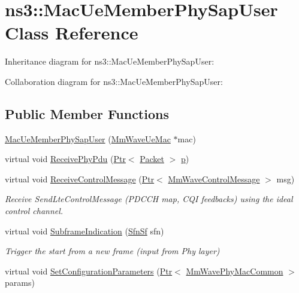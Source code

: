 \hypertarget{classns3_1_1MacUeMemberPhySapUser}{}\section{ns3\+:\+:Mac\+Ue\+Member\+Phy\+Sap\+User Class Reference}
\label{classns3_1_1MacUeMemberPhySapUser}


Inheritance diagram for ns3\+:\+:Mac\+Ue\+Member\+Phy\+Sap\+User\+:


Collaboration diagram for ns3\+:\+:Mac\+Ue\+Member\+Phy\+Sap\+User\+:
\subsection*{Public Member Functions}
\begin{DoxyCompactItemize}
\item 
\hyperlink{classns3_1_1MacUeMemberPhySapUser_aa62c846fbddf901d553ececf516ca205}{Mac\+Ue\+Member\+Phy\+Sap\+User} (\hyperlink{classns3_1_1MmWaveUeMac}{Mm\+Wave\+Ue\+Mac} $\ast$mac)
\item 
virtual void \hyperlink{classns3_1_1MacUeMemberPhySapUser_a532cf7fbc3313fbf3246eca29e65164b}{Receive\+Phy\+Pdu} (\hyperlink{classns3_1_1Ptr}{Ptr}$<$ \hyperlink{classns3_1_1Packet}{Packet} $>$ \hyperlink{lte__link__budget__x2__handover__measures_8m_ac9de518908a968428863f829398a4e62}{p})
\item 
virtual void \hyperlink{classns3_1_1MacUeMemberPhySapUser_a6698cd39ee54360d3d38c4c3698304d2}{Receive\+Control\+Message} (\hyperlink{classns3_1_1Ptr}{Ptr}$<$ \hyperlink{classns3_1_1MmWaveControlMessage}{Mm\+Wave\+Control\+Message} $>$ msg)
\begin{DoxyCompactList}\small\item\em Receive Send\+Lte\+Control\+Message (P\+D\+C\+CH map, C\+QI feedbacks) using the ideal control channel. \end{DoxyCompactList}\item 
virtual void \hyperlink{classns3_1_1MacUeMemberPhySapUser_a21adda277318c6f99d9ad4764c3ce36c}{Subframe\+Indication} (\hyperlink{structns3_1_1SfnSf}{Sfn\+Sf} sfn)
\begin{DoxyCompactList}\small\item\em Trigger the start from a new frame (input from Phy layer) \end{DoxyCompactList}\item 
virtual void \hyperlink{classns3_1_1MacUeMemberPhySapUser_aabe2ba69cf2649de96dc4dd5c714f2d9}{Set\+Configuration\+Parameters} (\hyperlink{classns3_1_1Ptr}{Ptr}$<$ \hyperlink{classns3_1_1MmWavePhyMacCommon}{Mm\+Wave\+Phy\+Mac\+Common} $>$ params)
\end{DoxyCompactItemize}
